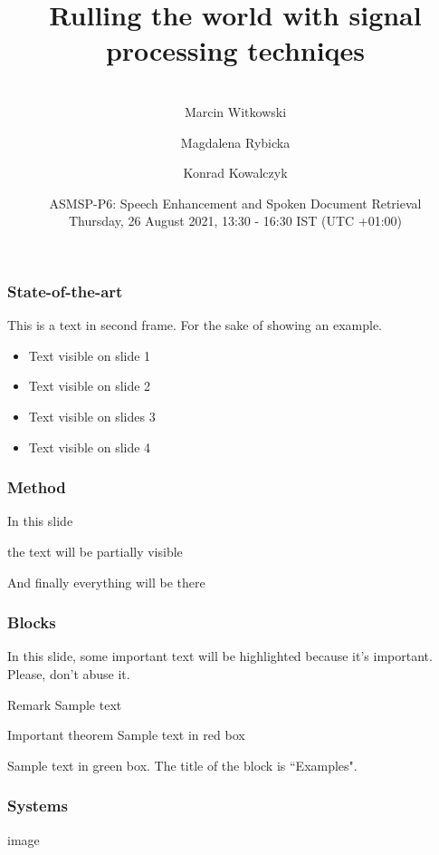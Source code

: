 \documentclass[aspectratio=169]{beamer}
\title[Short Title] %
{Rulling the world with signal processing techniqes}
\author[M. Witkowski, M. Rybicka, K. Kowalczyk] %
{\\Marcin Witkowski \and Magdalena Rybicka \and Konrad Kowalczyk}
\institute[AGH] %
{\\\\
\begin{tabular}[h]{ccc}
    \texttt{[image: logo\_DSP\_wavelet\_AGH.png]}\;\;\;\;\;\;\;\;& 
      \texttt{[image: agh\_nzw\_s\_en\_1w\_wbr\_cmyk.eps]}\;\;\;\;\;\;\;\;&  
      \texttt{[image: conf.png]}%

  \end{tabular} \\\\

}
\date[EUSIPCO 2021] %
{ASMSP-P6: Speech Enhancement and Spoken Document Retrieval\\
Thursday, 26 August 2021, 13:30 - 16:30 IST (UTC +01:00)\\}
\begin{document}
\frame[plain]{\titlepage}


\begin{frame}
\frametitle{State-of-the-art}
This is a text in second frame. For the sake of showing an example.

\begin{itemize}
    \item<1-> Text visible on slide 1
    \item<2-> Text visible on slide 2
    \item<3> Text visible on slides 3
    \item<4-> Text visible on slide 4
\end{itemize}
\end{frame}



\begin{frame}
\frametitle{Method}
In this slide \pause

the text will be partially visible \pause

And finally everything will be there
\end{frame}


\begin{frame}
\frametitle{Blocks}

In this slide, some important text will be
\alert{highlighted} because it's important.
Please, don't abuse it.

\begin{block}{Remark}
Sample text
\end{block}

\begin{alertblock}{Important theorem}
Sample text in red box
\end{alertblock}

\begin{examples}
Sample text in green box. The title of the block is ``Examples".
\end{examples}
\end{frame}
\begin{frame}
\frametitle{Systems}
\centering
image
\end{frame}
\end{document}
